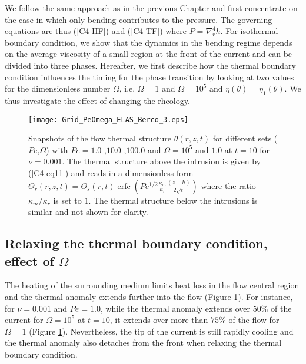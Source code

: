 We  follow the  same approach  as in  the previous  Chapter and  first
concentrate  on the  case in  which  only bending  contributes to  the
pressure.   The   governing  equations  are  thus   (\ref{C4-HF})  and
(\ref{C4-TF})  where  $P  =  \nabla_r^4h$.   For  isothermal  boundary
condition, we show that the dynamics  in the bending regime depends on
the average  viscosity of a small  region at the front  of the current
and can be divided into three phases. Hereafter, we first describe how
the thermal  boundary condition  influences the  timing for  the phase
transition  by looking  at  two values  for  the dimensionless  number
$\Omega$,     i.e.       $\Omega=1$     and      $\Omega=10^5$     and
$\eta(\theta)=\eta_1(\theta)$.   We  thus  investigate the  effect  of
changing the rheology.

\begin{figure}[h!]
  \begin{center}
    \graphicspath{ {/Users/thorey/Documents/These/Projet/Refroidissement/Skin_Model/Figure/Figure_Heating/} }
    \texttt{[image: Grid\_PeOmega\_ELAS\_Berco\_3.eps]}
    \caption{Snapshots of  the flow thermal  structure $\theta(r,z,t)$
      for  different  sets  ($Pe$,$\Omega$)  with  $Pe=  1.0$  ,$10.0$
      ,$100.0$   and   $\Omega=10^5$   and   $1.0$   at   $t=10$   for
      $\nu=0.001$. The thermal structure  above the intrusion is given
      by   (\ref{C4-eq11})  and   reads   in   a  dimensionless   form
      $\Theta_r(r,z,t)=\Theta_s(r,t)\operatorname{erfc}{\left(Pe^{1/2}\frac{\kappa_m}{\kappa_r}\frac{(z-h)}{2\sqrt{t}}\right)}$
      where the ratio  $\kappa_m/\kappa_r$ is set to  $1$. The thermal
      structure  below the  intrusions is  similar and  not shown  for
      clarity.}
    \label{C4-Grid_PeOmega_Heating}
  \end{center}
\end{figure}

\subsection{Relaxing  the   thermal  boundary  condition,   effect  of
  $\Omega$}
\label{C4-sec:infl-therm-bound-el}

The heating  of the surrounding  medium limits  heat loss in  the flow
central region and  the thermal anomaly extends further  into the flow
(Figure \ref{C4-Grid_PeOmega_Heating}). For  instance, for $\nu=0.001$
and $Pe=1.0$,  while the  thermal anomaly extends  over $50\%$  of the
current  for $\Omega  = 10^5$  at $t=10$,  it extends  over more  than
$75\%$      of      the      flow     for      $\Omega=1$      (Figure
\ref{C4-Grid_PeOmega_Heating}). Nevertheless,  the tip of  the current
is still  rapidly cooling and  the thermal anomaly also  detaches from
the front when relaxing the thermal boundary condition.

